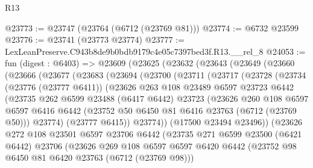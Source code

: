 \begin{lexlean}{R13}
\begin{coremodule}
@23773 := @23747 (@23764 (@6712 (@23769 @81)))
@23774 := @6732 @23599
@23776 := @23741 (@23773 @23774)
@23777 := LexLeanPreserve.C943b8de9b0bdb9179c4e05c7397bed3f.R13.__rel_8
@24053 := fun (digest : @6403) =>
  @23609
    (@23625
      (@23632
        (@23643
          (@23649
            (@23660
              (@23666
                (@23677
                  (@23683
                    (@23694
                      (@23700
                        (@23711
                          (@23717
                            (@23728
                              (@23734
                                (@23776 (@23777 @6411))
                                (@23626
                                  @263
                                  @108
                                  @23489
                                  @6597
                                  @23723
                                  @6442
                                  (@23735
                                    @262
                                    @6599
                                    @23488
                                    (@6417 @6442)
                                    @23723
                                    (@23626
                                      @260
                                      @108
                                      @6597
                                      @6597
                                      @6416
                                      @6442
                                      (@23752 @50 @6450 @81 @6416 @23763 (@6712 (@23769 @50)))
                                      @23774)
                                    (@23777 @6415))
                                  @23774))
                              (@17500 @23494 @23496))
                            (@23626
                              @272
                              @108
                              @23501
                              @6597
                              @23706
                              @6442
                              (@23735
                                @271
                                @6599
                                @23500
                                (@6421 @6442)
                                @23706
                                (@23626
                                  @269
                                  @108
                                  @6597
                                  @6597
                                  @6420
                                  @6442
                                  (@23752 @98 @6450 @81 @6420 @23763 (@6712 (@23769 @98)))

\end{coremodule}
\end{lexlean}
